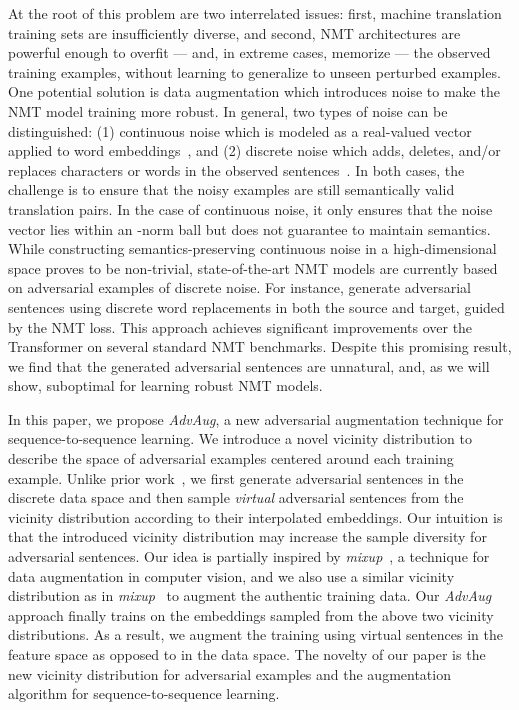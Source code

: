 \documentclass[11pt,a4paper]{article}
\newcommand{\fancyname}{AdvAug}
\newcommand{\mixup}{\textit{mixup}\xspace}
\begin{document}
At the root of this problem are two interrelated issues: first, machine translation training sets are insufficiently diverse, and second, NMT architectures are powerful enough to overfit --- and, in extreme cases, memorize --- the observed training examples, without learning to generalize to unseen perturbed examples.
One potential solution is data augmentation which introduces noise to make the NMT model training more robust.
In general, two types of noise can be distinguished: (1) continuous noise which is modeled as a real-valued vector applied to word embeddings~\cite{Miyato:15,Miyato:17,Cheng:18,Sano:19}, and (2) discrete noise which adds, deletes, and/or replaces characters or words in the observed sentences~\cite{Belinkov:17, Sperber:17, Ebrahimi:18b, Michel:19, Cheng:19, Karpukhin:19}. In both cases, the challenge is to ensure that the noisy examples are still semantically valid translation pairs.
In the case of continuous noise, it only ensures that the noise vector lies within an -norm ball but does not guarantee to maintain semantics.
While constructing semantics-preserving continuous noise in a high-dimensional space proves to be non-trivial, state-of-the-art NMT models are currently based on adversarial examples of discrete noise.
For instance, \citet{Cheng:19} generate adversarial sentences using discrete word replacements in both the source and target, guided by the NMT loss. This approach achieves significant improvements over the Transformer on several standard NMT benchmarks.
Despite this promising result, we find that the generated adversarial sentences are unnatural, and, as we will show, suboptimal for learning robust NMT models.



In this paper, we propose {\em \fancyname}, a new adversarial augmentation technique for sequence-to-sequence learning. We introduce a novel vicinity distribution to describe the space of adversarial examples centered around each training example. Unlike prior work~\cite{Cheng:19}, we first generate adversarial sentences in the discrete data space and then sample \emph{virtual} adversarial sentences from the vicinity distribution according to their interpolated embeddings. Our intuition is that the introduced vicinity distribution may increase the sample diversity for adversarial sentences. Our idea is partially inspired by \mixup~\cite{Zhang:18}, a technique for data augmentation in computer vision, and we also use a similar vicinity distribution as in \mixup~ to augment the authentic training data.
Our {\em \fancyname} approach finally trains on the embeddings sampled from the above two vicinity distributions. As a result, we augment the training using virtual sentences in the feature space as opposed to in the data space. The novelty of our paper is the new vicinity distribution for adversarial examples and the augmentation algorithm for sequence-to-sequence learning.
\end{document}
